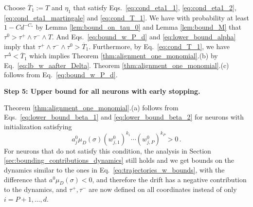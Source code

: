 \documentclass[11pt]{article}
\newcommand{\<}{\langle}
\renewcommand{\>}{\rangle}
\theoremstyle{definition}
\def\oT{\overline{T}}
\begin{document}
Choose $\oT_1 := T$ and $\eta_1 $ that satisfy Eqs.~\eqref{eq:cond_eta1_1}, \eqref{eq:cond_eta1_2}, \eqref{eq:cond_eta1_martingale} and \eqref{eq:cond_T_1}. We have with probability at least $1 - C d^{-C_*}$ by Lemma \ref{lem:bound_on_tau_0} and Lemma \ref{lem:bound_M} that $\tau^0 > \tau^+ \wedge \tau^- \wedge T$. And Eqs.~\eqref{eq:bound_w_P_d} and \eqref{eq:lower_bound_alpha} imply that $\tau^+ \wedge \tau^- \wedge \tau^0 > \oT_1$. Furthermore, by Eq.~\eqref{eq:cond_T_1}, we have $\tau^{\Delta} < \oT_1$ which implies Theorem \ref{thm:alignment_one_monomial}.(b) by Eq.~\eqref{eq:lb_w_aafter_Delta}. Theorem \ref{thm:alignment_one_monomial}.(c) follows from Eq.~\eqref{eq:bound_w_P_d}. 


\noindent
\textbf{Step 5: Upper bound for all neurons with early stopping.}

Theorem \ref{thm:alignment_one_monomial}.(a) follows from Eqs.~\eqref{eq:lower_bound_beta_1} and \eqref{eq:lower_bound_beta_2} for neurons with initialization satisfying 
\[
a_j^0 \mu_D (\sigma) (w_{j,1}^0)^{k_1} \cdots (w_{j,P}^0)^{k_P} > 0 \, .
\]
For neurons that do not satisfy this condition, the analysis in Section \ref{sec:bounding_contributions_dynamics} still holds and we get bounds on the dynamics similar to the ones in Eq.~\eqref{eq:trajectories_w_bounds}, with the difference that $a^0 \mu_D (\sigma) < 0$, and therefore the drift has a negative contribution to the dynamics, and $\tau^+, \tau^-$ are now defined on all coordinates instead of only $i = P+1 , \ldots , d$.
\end{document}
